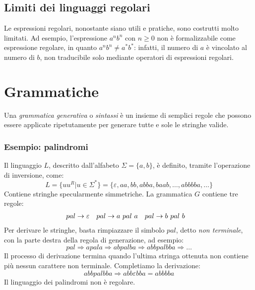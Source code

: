 \documentclass[11pt]{article}
\begin{document}
\subsection{Limiti dei linguaggi regolari}
Le espressioni regolari, nonostante siano utili e pratiche, sono costrutti molto limitati. Ad esempio, l'espressione 
$a^n b^n$ con $n\geq 0$ non è formalizzabile come espressione regolare, in quanto $a^n b^n \neq a^* b^*$: infatti, il 
numero di $a$ è vincolato al numero di $b$, non traducibile solo mediante operatori di espressioni regolari.
\section{Grammatiche}
Una \textit{grammatica generativa} o \textit{sintassi} è un insieme di semplici regole che possono essere applicate ripetutamente 
per generare tutte e sole le stringhe valide.
\subsubsection*{Esempio: palindromi}
Il linguaggio $L$, descritto dall'alfabeto $\Sigma=\{a,b\}$, è definito, tramite l'operazione di inversione, come:
\begin{equation*}
    L=\{uu^R|u\in \Sigma^*\}=\{\varepsilon,aa,bb,abba,baab,\dots,abbbba,\dots\}
\end{equation*}
Contiene stringhe specularmente simmetriche. La grammatica $G$ contiene tre regole:
\begin{align*}
    pal&\rightarrow\varepsilon & pal&\rightarrow a\textnormal{ }pal\textnormal{ }a & pal&\rightarrow b\textnormal{ }pal\textnormal{ }b
\end{align*}
Per derivare le stringhe, basta rimpiazzare il simbolo $pal$, detto \textit{non terminale}, con la parte destra della regola 
di generazione, ad esempio:
\begin{equation*}
    pal\Rightarrow a pal a\Rightarrow a b pal b a \Rightarrow a b b pal b b a \Rightarrow\dots
\end{equation*}
Il processo di derivazione termina quando l'ultima stringa ottenuta non contiene più nessun carattere non terminale. 
Completiamo la derivazione:
\begin{equation*}
    a b b pal b b a \Rightarrow a b b \varepsilon b b a = abbbba
\end{equation*}
Il linguaggio dei palindromi non è regolare.
\end{document}
